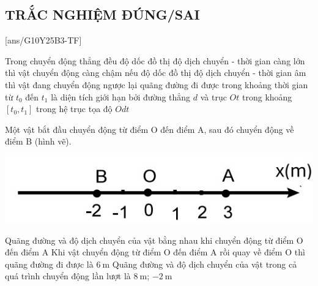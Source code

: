 \subsection{TRẮC NGHIỆM ĐÚNG/SAI}
\setcounter{ex}{0}
[ans/G10Y25B3-TF]
\begin{ex}
	Trong chuyển động thẳng đều
	{độ dốc đồ thị độ dịch chuyển - thời gian càng lớn thì vật chuyển động càng chậm}
	{\True nếu độ dốc đồ thị độ dịch chuyển - thời gian âm thì vật đang chuyển động ngược lại}
	{quãng đường đi được trong khoảng thời gian từ $t_0$ đến $t_1$ là diện tích giới hạn bởi đường thẳng $d$ và trục $Ot$ trong khoảng $[t_0, t_1]$ trong hệ trục tọa độ $Odt$}
	\loigiai{}
\end{ex}
\begin{ex}
	Một vật bắt đầu chuyển động từ điểm O đến điểm A, sau đó chuyển động về điểm B (hình vẽ).
	\begin{center}
		\includegraphics[scale=0.7]{figs/G10Y25B3-37}
	\end{center}
	{\True Quãng đường và độ dịch chuyển của vật bằng nhau khi chuyển động từ điểm O đến điểm A}
	{\True Khi vật chuyển động từ điểm O đến điểm A rồi quay về điểm O thì quãng đường đi được là $\SI{6}{\meter}$}
	{\True Quãng đường và độ dịch chuyển của vật trong cả quá trình chuyển động lần lượt là $\SI{8}{\meter}$; $\SI{-2}{\meter}$}
	\loigiai{}
\end{ex}
